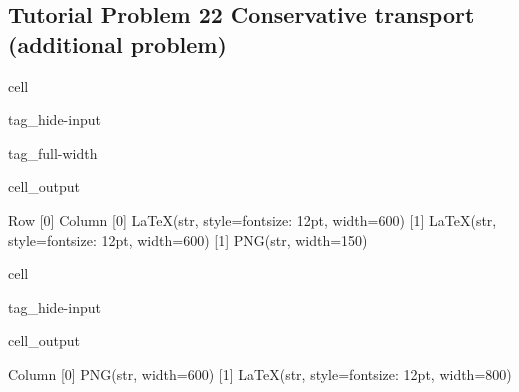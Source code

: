 \documentclass[letterpaper,10pt,english]{jupyterBook}
\begin{document}
\subsection{Tutorial Problem 22 \sphinxhyphen{} Conservative transport (additional problem)}
\label{\detokenize{content/tutorials/T9/tutorial_09:tutorial-problem-22-conservative-transport-additional-problem}}
\begin{sphinxuseclass}{cell}
\begin{sphinxuseclass}{tag_hide-input}
\begin{sphinxuseclass}{tag_full-width}\begin{sphinxVerbatimOutput}

\begin{sphinxuseclass}{cell_output}
\begin{sphinxVerbatim}[commandchars=\\\{\}]
Row
    [0] Column
        [0] LaTeX(str, style=\PYGZob{}\PYGZsq{}font\PYGZhy{}size\PYGZsq{}: \PYGZsq{}12pt\PYGZsq{}\PYGZcb{}, width=600)
        [1] LaTeX(str, style=\PYGZob{}\PYGZsq{}font\PYGZhy{}size\PYGZsq{}: \PYGZsq{}12pt\PYGZsq{}\PYGZcb{}, width=600)
    [1] PNG(str, width=150)
\end{sphinxVerbatim}

\end{sphinxuseclass}\end{sphinxVerbatimOutput}

\end{sphinxuseclass}
\end{sphinxuseclass}
\end{sphinxuseclass}
\begin{sphinxuseclass}{cell}
\begin{sphinxuseclass}{tag_hide-input}\begin{sphinxVerbatimOutput}

\begin{sphinxuseclass}{cell_output}
\begin{sphinxVerbatim}[commandchars=\\\{\}]
Column
    [0] PNG(str, width=600)
    [1] LaTeX(str, style=\PYGZob{}\PYGZsq{}font\PYGZhy{}size\PYGZsq{}: \PYGZsq{}12pt\PYGZsq{}\PYGZcb{}, width=800)
\end{sphinxVerbatim}

\end{sphinxuseclass}\end{sphinxVerbatimOutput}

\end{sphinxuseclass}
\end{sphinxuseclass}
\end{document}

